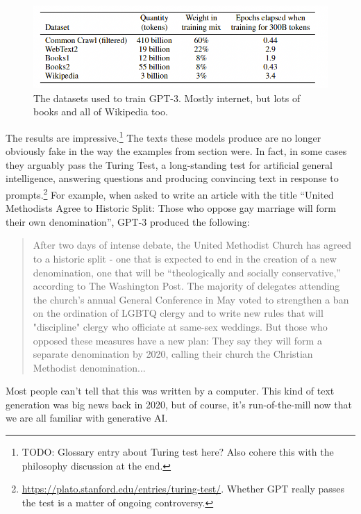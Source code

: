 \begin{figure}[h]
\centering
\includegraphics[scale=.4]{./images/gptDatasets}
\caption[GPT Technical report. Todo]{The datasets used to train GPT-3. Mostly internet, but lots of books and all of Wikipedia too. }
\label{gptDatasets}
\end{figure}

The results are impressive.\footnote{TODO: Glossary entry about Turing test here? Also cohere this with the philosophy discussion at the end.} The texts these models produce are no longer obviously fake in the way the examples from section  were. In fact, in some cases they arguably pass the Turing Test, a long-standing test for artificial general intelligence, answering questions and producing convincing  text in response to prompts.\footnote{\url{https://plato.stanford.edu/entries/turing-test/}. Whether GPT really passes the test is a matter of ongoing controversy.} For example, when asked to write an article with the title ``United Methodists Agree to Historic Split: Those who oppose gay marriage will form their own denomination'', GPT-3 produced the following:
\begin{quote}
After two days of intense debate, the United Methodist Church has agreed to a historic split - one that is expected to end in the creation of a new denomination, one that will be ``theologically and socially conservative,'' according to The Washington Post. The majority of delegates attending the church's annual General Conference in May voted to strengthen a ban on the ordination of LGBTQ clergy and to write new rules that will "discipline" clergy who officiate at same-sex weddings. But those who opposed these measures have a new plan: They say they will form a separate denomination by 2020, calling their church the Christian Methodist denomination...
\end{quote}
Most people can't tell that this was written by a computer.  This kind of text generation was big news back in 2020, but of course, it's run-of-the-mill now that we are all familiar with generative AI.

